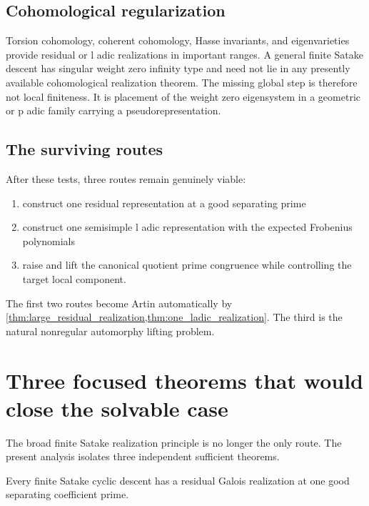 \documentclass{aomart}
\theoremstyle{definition}
\theoremstyle{remark}
\begin{document}
\subsection{Cohomological regularization}

Torsion cohomology, coherent cohomology, Hasse invariants, and eigenvarieties provide residual or l adic realizations in important ranges. A general finite Satake descent has singular weight zero infinity type and need not lie in any presently available cohomological realization theorem. The missing global step is therefore not local finiteness. It is placement of the weight zero eigensystem in a geometric or p adic family carrying a pseudorepresentation.

\subsection{The surviving routes}

After these tests, three routes remain genuinely viable:

\begin{enumerate}
\item construct one residual representation at a good separating prime
\item construct one semisimple l adic representation with the expected Frobenius polynomials
\item raise and lift the canonical quotient prime congruence while controlling the target local component.
\end{enumerate}

The first two routes become Artin automatically by \cref{thm:large_residual_realization,thm:one_ladic_realization}. The third is the natural nonregular automorphy lifting problem.

\section{Three focused theorems that would close the solvable case}\label{sec:focused_conjecture}

The broad finite Satake realization principle is no longer the only route. The present analysis isolates three independent sufficient theorems.

\begin{definition}\label{def:SRRP}
Every finite Satake cyclic descent has a residual Galois realization at one good separating coefficient prime.
\end{definition}
\end{document}
